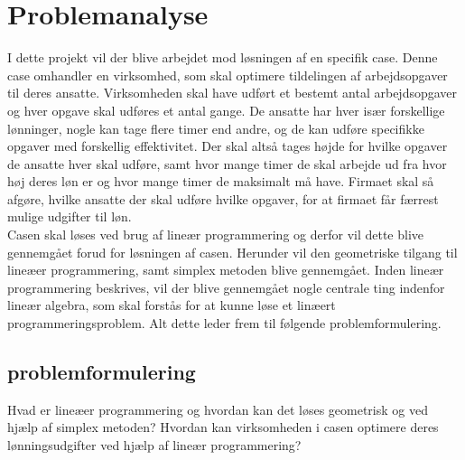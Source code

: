 \chapter{Problemanalyse}

I dette projekt vil der blive arbejdet mod løsningen af en specifik case. 
Denne case omhandler en virksomhed, som skal optimere tildelingen af arbejdsopgaver til deres ansatte.
Virksomheden skal have udført et bestemt antal arbejdsopgaver og hver opgave skal udføres et antal gange. 
De ansatte har hver især forskellige lønninger, nogle kan tage flere timer end andre, og de kan udføre specifikke opgaver med forskellig effektivitet.
Der skal altså tages højde for hvilke opgaver de ansatte hver skal udføre, samt hvor mange timer de skal arbejde ud fra hvor høj deres løn er og hvor mange timer de maksimalt må have.
Firmaet skal så afgøre, hvilke ansatte der skal udføre hvilke opgaver, for at firmaet får færrest mulige udgifter til løn. \\
Casen skal løses ved brug af lineær programmering og derfor vil dette blive gennemgået forud for løsningen af casen. 
Herunder vil den geometriske tilgang til lineæer programmering, samt simplex metoden blive gennemgået. 
Inden lineær programmering beskrives, vil der blive gennemgået nogle centrale ting indenfor lineær algebra, som skal forstås for at kunne løse et linæert programmeringsproblem.
Alt dette leder frem til følgende problemformulering.

\section{problemformulering}
Hvad er lineæer programmering og hvordan kan det løses geometrisk og ved hjælp af simplex metoden? Hvordan kan virksomheden i casen optimere deres lønningsudgifter ved hjælp af lineær programmering?
